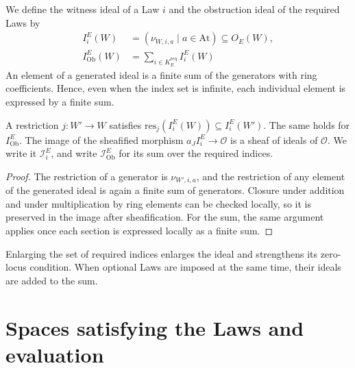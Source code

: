 \begin{definition}\label{def:2.3}

We define the witness ideal of a Law $i$ and the obstruction ideal of the required Laws by
\begin{equation*}
\begin{aligned}
I_i^E(W)&=(\nu_{W,i,a}\mid a\in\mathrm{At})\subseteq O_E(W),\\
I_{\mathrm{Ob}}^E(W)&=\sum_{i\in K_E^{\mathrm{req}}}I_i^E(W)
\end{aligned}
\tag{2.2}\label{eq:2.2}
\end{equation*}
An element of a generated ideal is a finite sum of the generators with ring coefficients.
Hence, even when the index set is infinite, each individual element is expressed by a
finite sum.

\end{definition}

\begin{proposition}\label{prop:2.4}

A restriction $j:W'\to W$ satisfies $\mathrm{res}_j(I_i^E(W))\subseteq I_i^E(W')$. The same
holds for $I_{\mathrm{Ob}}^E$. The image of the sheafified morphism
$a_JI_i^E\to\mathcal{O}$ is a sheaf of ideals of $\mathcal{O}$. We write it
$\mathcal{I}_i^E$, and write $\mathcal{I}_{\mathrm{Ob}}^E$ for its sum over the required
indices.

\end{proposition}

\begin{proof}

The restriction of a generator is $\nu_{W',i,a}$, and the restriction of any element of the
generated ideal is again a finite sum of generators. Closure under addition and under
multiplication by ring elements can be checked locally, so it is preserved in the image
after sheafification. For the sum, the same argument applies once each section is expressed
locally as a finite sum.

\end{proof}

Enlarging the set of required indices enlarges the ideal and strengthens its zero-locus
condition. When optional Laws are imposed at the same time, their ideals are added to the
sum.

\section{Spaces satisfying the Laws and evaluation}\label{sec:2.2}

